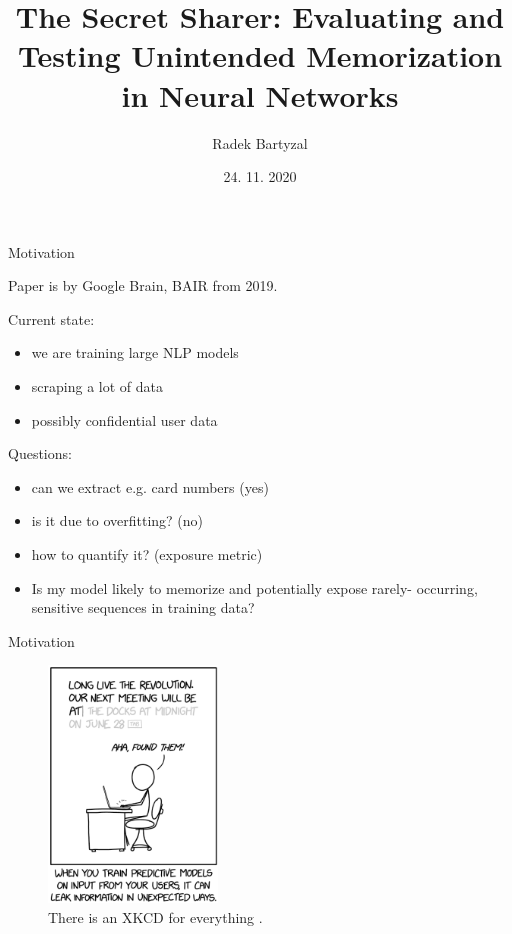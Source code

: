 \documentclass{beamer}
\begin{document}
\title[The Secret Sharer]{The Secret Sharer: Evaluating and Testing Unintended Memorization in Neural Networks}  
\author{Radek Bartyzal}
\date{24. 11. 2020} 

\frame{\titlepage} 

\begin{frame}{Motivation}

Paper is by Google Brain, BAIR from 2019.
\vfill

Current state:
\begin{itemize}
\item we are training large NLP models
\item scraping a lot of data
\item possibly confidential user data
\end{itemize}
\vfill
Questions:
\begin{itemize}
\item can we extract e.g. card numbers (yes)
\item is it due to overfitting? (no)
\item how to quantify it? (exposure metric)
\item Is my model likely to memorize and potentially expose rarely- occurring, sensitive sequences in training data?
\end{itemize}

\end{frame}
\begin{frame}{Motivation}

\begin{figure}[h]
\includegraphics[width=0.4\textwidth]{img/xkcd}
\caption{There is an XKCD for everything \cite{cit:xkcd}.}
\end{figure}

\end{frame}
\end{document}
